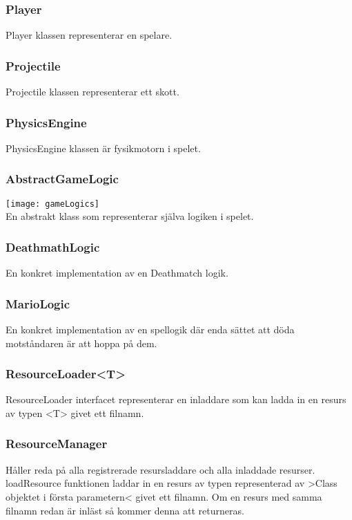 \subsubsection{Player}
Player klassen representerar en spelare.\\
\subsubsection{Projectile}
Projectile klassen representerar ett skott.\\
\subsubsection{PhysicsEngine}
PhysicsEngine klassen är fysikmotorn i spelet.\\
\subsubsection{AbstractGameLogic}
\texttt{[image: gameLogics]}\\
En abstrakt klass som representerar själva logiken i spelet.\\
\subsubsection{DeathmathLogic}
En konkret implementation av en Deathmatch logik.\\
\subsubsection{MarioLogic}
En konkret implementation av en spellogik där enda sättet att döda motståndaren är att hoppa på dem.\\
\subsubsection{ResourceLoader<T>}
ResourceLoader interfacet representerar en inladdare som kan ladda in en resurs av typen <T> givet ett filnamn.\\
\pagebreak
\subsubsection{ResourceManager}
Håller reda på alla registrerade resursladdare och alla inladdade resurser.\\
loadResource funktionen laddar in en resurs av typen representerad av >Class objektet i första parametern< givet ett filnamn. Om en resurs med samma filnamn redan är inläst så kommer denna att returneras.\\

